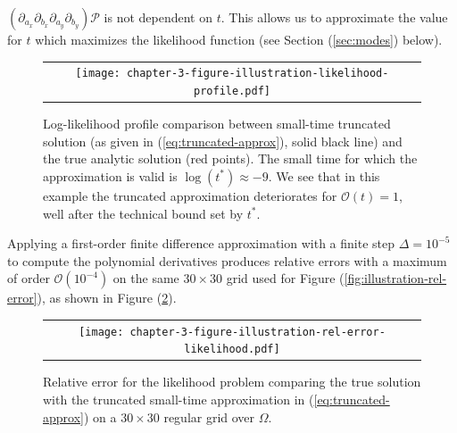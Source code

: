 \documentclass[10pt]{article}
\begin{document}
$\left(\partial_{a_x}\partial_{b_x} \partial_{a_y}\partial_{b_y}
\right)\mathcal{P}$ is not dependent on $t$. This allows us to
approximate the value for $t$ which maximizes the likelihood function
(see Section (\ref{sec:modes}) below).
\begin{figure}
  \begin{tabular}{c}
    \begin{minipage}{0.90\textwidth}
      \centering
      \texttt{[image: chapter-3-figure-illustration-likelihood-profile.pdf]}
      \caption{Log-likelihood profile comparison between small-time
        truncated solution (as given in (\ref{eq:truncated-approx}),
        solid black line) and the true analytic solution (red
        points). The small time for which the approximation is valid
        is $\log(t^*) \approx -9$. We see that in this example the
        truncated approximation deteriorates for $\mathcal{O}(t) = 1$,
        well after the technical bound set by $t^*$.}
      \label{fig:illustration-likelihood-profile}
    \end{minipage}
  \end{tabular}
\end{figure}
Applying a first-order finite difference approximation with a finite
step $\Delta = 10^{-5}$ to compute the polynomial derivatives produces
relative errors with a maximum of order $\mathcal{O}(10^{-4})$ on the
same $30 \times 30$ grid used for Figure
(\ref{fig:illustration-rel-error}), as shown in Figure
(\ref{fig:illustration-rel-error-likelihood}).
\begin{figure}
  \centering
  \begin{tabular}{c}
    \begin{minipage}{0.50\textwidth}
      \centering
      \texttt{[image: chapter-3-figure-illustration-rel-error-likelihood.pdf]}
      \caption{Relative error for the likelihood problem comparing the
        true solution with the truncated small-time approximation in
        (\ref{eq:truncated-approx}) on a $30 \times 30$ regular grid
        over $\Omega$. }
      \label{fig:illustration-rel-error-likelihood}
    \end{minipage}
    \end{tabular}
\end{figure}
\end{document}
